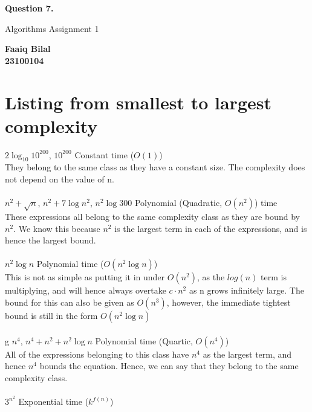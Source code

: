 \documentclass[]{article}
\begin{document}
\begin{center}
    \vspace*{1cm}

    \textbf{Question 7.}

    \vspace{0.5cm}
     Algorithms Assignment 1

    \vspace{0.15cm}

    \textbf{Faaiq Bilal} \\ 
    \textbf{23100104}
         
\end{center}

\section{Listing from smallest to largest complexity}

$2 \log_{10} 10^{200}$, $10^{200}$ Constant time ($O(1)$) \\ 
They belong to the same class as they have a constant size. The complexity does not depend on the value of n. \\ \\
$n^2 + \sqrt{n}$, $n^2 + 7 \log n^2$, $ n^2 \log 300  $  Polynomial (Quadratic, $O(n^2)$) time \\ 
These expressions all belong to the same complexity class as they are bound by $n^2$. We know this because $n^2$ is the largest term in each of the expressions, and is hence the largest bound. \\ \\
$ n^2 \log n $ Polynomial time ($O(n^2 \log n)$) \\ 
This is not as simple as putting it in under $O(n^2)$, as the $log(n)$ term is multiplying, and will hence always overtake $c \cdot n^2$ as n grows infinitely large. The bound for this can also be given as $O(n^3)$, however, the immediate tightest bound is still in the form $O(n^2 \log n)$ \\ \\g
$ n^4 $, $ n^4 + n^2 + n^2 \log n $ Polynomial time (Quartic, $O(n^4)$) \\ 
All of the expressions belonging to this class have $n^4$ as the largest term, and hence $n^4$ bounds the equation. Hence, we can say that they belong to the same complexity class. \\ \\
$ 3^{n^2} $ Exponential time ($k^{f(n)}$) \\ \\
\end{document}
